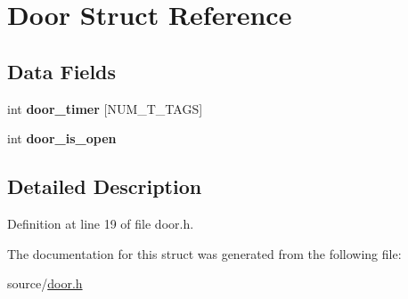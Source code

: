 \hypertarget{structDoor}{}\section{Door Struct Reference}
\label{structDoor}
\subsection*{Data Fields}
\begin{DoxyCompactItemize}
\item 
\mbox{\label{structDoor_aa5e2ba489f890ed656ac936513fd90fb}} 
int {\bfseries door\+\_\+timer} \mbox{[}N\+U\+M\+\_\+\+T\+\_\+\+T\+A\+GS\mbox{]}
\item 
\mbox{\label{structDoor_a7e103b2e2527ecdead0dfd1f07366de9}} 
int {\bfseries door\+\_\+is\+\_\+open}
\end{DoxyCompactItemize}


\subsection{Detailed Description}


Definition at line 19 of file door.\+h.



The documentation for this struct was generated from the following file\+:\begin{DoxyCompactItemize}
\item 
source/\mbox{\hyperlink{door_8h}{door.\+h}}\end{DoxyCompactItemize}
